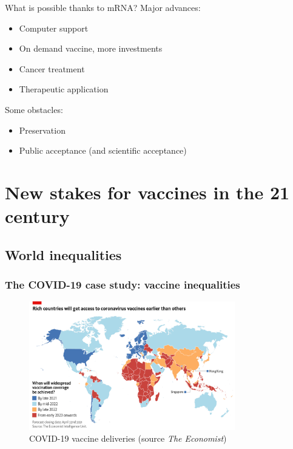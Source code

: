 \begin{frame}{What is possible thanks to mRNA?}
    Major advances:
    \begin{itemize}
        \item Computer support
        \item On demand vaccine, more investments
        \item Cancer treatment %
        \item Therapeutic application
    \end{itemize}
    Some obstacles:
    \begin{itemize}
        \item Preservation
        \item Public acceptance (and scientific acceptance)
    \end{itemize}
\end{frame}

\section{New stakes for vaccines in the 21 century}
\subsection{World inequalities}

\begin{frame}
    \frametitle{The COVID-19 case study: vaccine inequalities}
    \begin{figure}
        \centering
        \includegraphics[width=0.8\textwidth]{imgs/Inequalities.png}
        \caption{COVID-19 vaccine deliveries (source \emph{The Economist})}
        \label{fig:responses6}
    \end{figure}
\end{frame}

